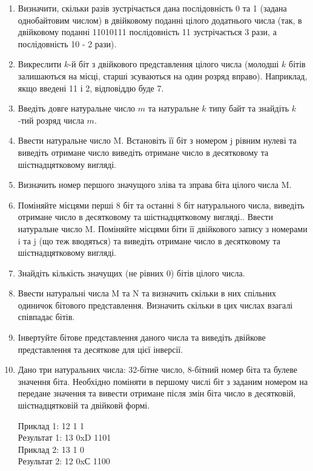 \documentclass[]{article}
\begin{document}
\begin{enumerate}
\item Визначити, скільки разів зустрічається дана послідовність 0 та 1 (задана однобайтовим числом) в двійковому поданні цілого додатнього числа (так, в двійковому поданні 11010111 послідовність 11 зустрічається 3 рази, а послідовність 10 - 2 рази).
\item Викреслити $k$-й біт з двійкового представлення цілого числа (молодші $k$ бітів залишаються на місці, старші зсуваються на один розряд вправо). Наприклад, якщо введені 11 і 2, відповіддю буде 7.
\item Введіть довге натуральне число $m$ та натуральне $k$ типу байт та знайдіть $k$-тий розряд числа $m$.
\item Ввести натуральне число M. Встановіть її біт з номером j рівним нулеві та виведіть отримане число виведіть отримане число в десятковому та шістнадцятковому вигляді.
\item Визначить номер першого значущого зліва та зправа біта цілого числа M.
\item Поміняйте місцями перші 8 біт та останні 8 біт натурального числа, виведіть отримане число в десятковому та шістнадцятковому вигляді..
Ввести натуральне число M. Поміняйте місцями біти її двійкового запису з номерами i та j (що теж вводяться) та виведіть отримане число в десятковому та шістнадцятковому вигляді.

\item Знайдіть кількість значущих (не рівних 0) бітів цілого числа.

\item Ввести натуральні числа M та N та визначить скільки в них спільних одиничок бітового представлення. Визначить скільки в цих числах взагалі співпадає бітів.

\item Інвертуйте бітове представлення даного числа та виведіть двійкове представлення та десяткове для цієї інверсії.

\item
 Дано три натуральних числа: 32-бітне число, 8-бітний номер біта та булеве значення біта.
Необхідно поміняти в першому числі біт з заданим номером на передане значення та
вивести отримане після змін біта число в десятковій, шістнадцятковій та двійковй формі.

Приклад 1:
12  1 1 \\
Результат 1:
13  0xD 1101\\
Приклад 2:
13  1 0\\
Результат 2:
12  0xС 1100



\end{enumerate}
\end{document}
